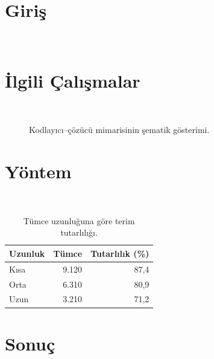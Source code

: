 \documentclass[10pt,a4paper,twocolumn]{article}
\begin{document}
\section{Giriş}
\paragrafA\ \paragrafB\ \paragrafC\ \paragrafA\ \paragrafB
\section{İlgili Çalışmalar}
\paragrafC\ \paragrafA\ \paragrafB\ \paragrafC\ \paragrafA\ \paragrafB\ \paragrafC
\begin{figure}[t]
\centering
{}
\caption{Kodlayıcı–çözücü mimarisinin şematik gösterimi.}
\end{figure}
\section{Yöntem}
\paragrafB\ \paragrafA\ \paragrafC\ \paragrafB\ \paragrafA\ \paragrafC\ \paragrafB\ \paragrafA
\begin{table}[b]
\centering
\caption{Tümce uzunluğuna göre terim tutarlılığı.}
\begin{tabular}{lrr}
\toprule
Uzunluk & Tümce & Tutarlılık (\%) \\
\midrule
Kısa & 9.120 & 87,4 \\
Orta & 6.310 & 80,9 \\
Uzun & 3.210 & 71,2 \\
\bottomrule
\end{tabular}
\end{table}
\section{Sonuç}
\paragrafC\ \paragrafA\ \paragrafB\ \paragrafC\ \paragrafA\ \paragrafB\ \paragrafC\ \paragrafA\ \paragrafB
\end{document}
